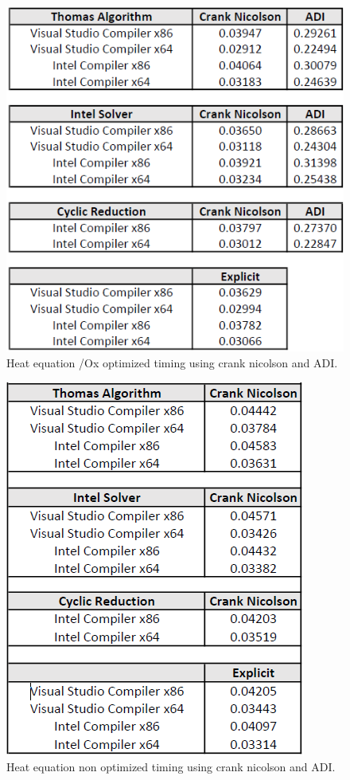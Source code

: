 \documentclass[12pt, oneside]{book}
\theoremstyle{plain}
\theoremstyle{definition}
\begin{document}
\begin{figure}[!htb]
    \centering
        \includegraphics[scale=0.6]{heatXOptimized.png}
    \caption{Heat equation /Ox optimized timing using crank nicolson and ADI.}
\end{figure}

\begin{figure}[!htb]
    \centering
        \includegraphics[scale=0.6]{bsNotOptimized.png}
    \caption{Heat equation non optimized timing using crank nicolson and ADI.}
\end{figure}
\end{document}
